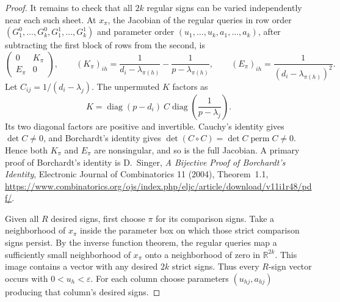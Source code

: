 \documentclass[11pt]{article}
\begin{document}
\begin{proof}
It remains to check that all $2k$ regular signs can be varied
independently near each such sheet. At $x_\pi$, the Jacobian of the
regular queries in row order $(G_1^0,\ldots,G_k^0,G_1^1,\ldots,G_k^1)$
and parameter order $(u_1,\ldots,u_k,a_1,\ldots,a_k)$, after subtracting
the first block of rows from the second, is
\[
 \begin{pmatrix}0&K_\pi\\E_\pi&0\end{pmatrix},\qquad
 (K_\pi)_{ih}=\frac1{d_i-\lambda_{\pi(h)}}-
                          \frac1{p-\lambda_{\pi(h)}},\qquad
 (E_\pi)_{ih}=\frac1{(d_i-\lambda_{\pi(h)})^2}.
\]
Let $C_{ij}=1/(d_i-\lambda_j)$. The unpermuted $K$ factors as
\[
 K=\operatorname{diag}(p-d_i)\ C
             \operatorname{diag}\left(\frac1{p-\lambda_j}\right).
\]
Its two diagonal factors are positive and invertible. Cauchy's
identity gives $\det C\neq0$, and Borchardt's identity gives
$\det(C\circ C)=\det C\operatorname{perm}C\neq0$.
Hence both $K_\pi$ and $E_\pi$ are nonsingular, and so is the
full Jacobian. A primary proof of Borchardt's identity is
D.~Singer, \emph{A Bijective Proof of Borchardt's Identity},
Electronic Journal of Combinatorics 11 (2004), Theorem~1.1,
\url{https://www.combinatorics.org/ojs/index.php/eljc/article/download/v11i1r48/pdf/}.

Given all $R$ desired signs, first choose $\pi$ for its comparison
signs. Take a neighborhood of $x_\pi$ inside the parameter box on
which those strict comparison signs persist. By the inverse function
theorem, the regular queries map a sufficiently small neighborhood
of $x_\pi$ onto a neighborhood of zero in $\mathbb R^{2k}$.
This image contains a vector with any desired $2k$ strict signs.
Thus every $R$-sign vector occurs with $0<u_h<\varepsilon$.
For each column choose parameters $(u_{hj},a_{hj})$ producing that
column's desired signs.


\end{proof}
\end{document}
